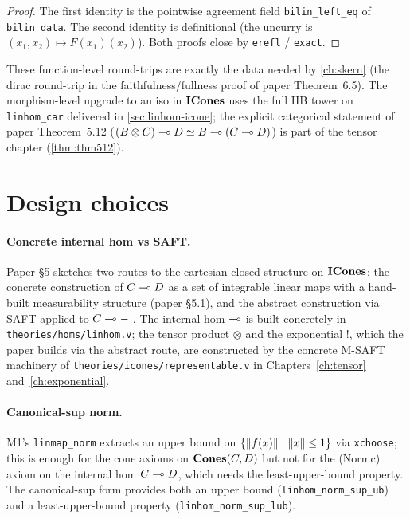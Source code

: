 \begin{proof}
The first identity is the pointwise agreement field
\texttt{bilin\_left\_eq} of \texttt{bilin\_data}. The second
identity is definitional (the uncurry is
$(x_1, x_2) \mapsto F(x_1)(x_2)$). Both proofs close by
\texttt{erefl} / \texttt{exact}.
\end{proof}

These function-level round-trips are exactly the data needed by
\autoref{ch:skern} (the dirac round-trip in the
faithfulness/fullness proof of paper Theorem~6.5). The morphism-level
upgrade to an iso in $\mathbf{ICones}$ uses the full HB tower on
\texttt{linhom\_car} delivered in \autoref{sec:linhom-icone}; the
explicit categorical statement of paper Theorem~5.12
($(B \otimes C) \multimap D \simeq B \multimap (C \multimap D)$) is part of the tensor
chapter (\autoref{thm:thm512}).

\section{Design choices}\label{sec:linhom-design}

\paragraph{Concrete internal hom vs SAFT.}
Paper \S5 sketches two routes to the cartesian closed structure on
$\mathbf{ICones}$: the concrete construction of $C \multimap D$ as a set of
integrable linear maps with a hand-built measurability structure
(paper \S5.1), and the abstract construction via SAFT applied to
$C \multimap -\;$. The internal hom $\multimap$ is built concretely in
\texttt{theories/homs/linhom.v}; the tensor product $\otimes$ and the
exponential $\mathord{!}$, which the paper builds via the abstract
route, are constructed by the concrete M-SAFT machinery of
\texttt{theories/icones/representable.v} in Chapters~\ref{ch:tensor}
and~\ref{ch:exponential}.

\paragraph{Canonical-sup norm.}
M1's \texttt{linmap\_norm} extracts an upper bound on
$\{\lVert f(x) \rVert \mid \lVert x \rVert \le 1\}$ via \texttt{xchoose}; this
is enough for the cone axioms on $\mathbf{Cones}(C, D)$ but not for the
(Normc) axiom on the internal hom $C \multimap D$, which needs the
least-upper-bound property. The canonical-sup form
 provides both an upper
bound (\texttt{linhom\_norm\_sup\_ub}) and a least-upper-bound
property (\texttt{linhom\_norm\_sup\_lub}).

